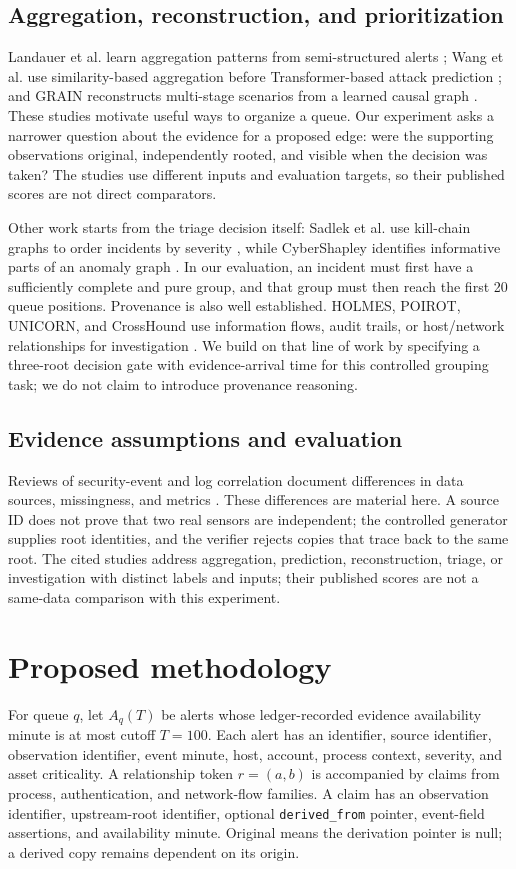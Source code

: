 \documentclass[pdflatex,sn-mathphys-num,iicol]{sn-jnl}
\begin{document}
\subsection{Aggregation, reconstruction, and prioritization}
Landauer et al. learn aggregation patterns from semi-structured alerts \cite{landauer2022}; Wang et al. use similarity-based aggregation before Transformer-based attack prediction \cite{wang2024}; and GRAIN reconstructs multi-stage scenarios from a learned causal graph \cite{grain2025}. These studies motivate useful ways to organize a queue. Our experiment asks a narrower question about the evidence for a proposed edge: were the supporting observations original, independently rooted, and visible when the decision was taken? The studies use different inputs and evaluation targets, so their published scores are not direct comparators.

Other work starts from the triage decision itself: Sadlek et al. use kill-chain graphs to order incidents by severity \cite{sadlek2025}, while CyberShapley identifies informative parts of an anomaly graph \cite{malach2025}. In our evaluation, an incident must first have a sufficiently complete and pure group, and that group must then reach the first 20 queue positions. Provenance is also well established. HOLMES, POIROT, UNICORN, and CrossHound use information flows, audit trails, or host/network relationships for investigation \cite{holmes2019,poirot2019,unicorn2020,crosshound2026}. We build on that line of work by specifying a three-root decision gate with evidence-arrival time for this controlled grouping task; we do not claim to introduce provenance reasoning.

\subsection{Evidence assumptions and evaluation}
Reviews of security-event and log correlation document differences in data sources, missingness, and metrics \cite{review2022,chuah2025}. These differences are material here. A source ID does not prove that two real sensors are independent; the controlled generator supplies root identities, and the verifier rejects copies that trace back to the same root. The cited studies address aggregation, prediction, reconstruction, triage, or investigation with distinct labels and inputs; their published scores are not a same-data comparison with this experiment.


\section{Proposed methodology}
For queue $q$, let $A_q(T)$ be alerts whose ledger-recorded evidence availability minute is at most cutoff $T=100$. Each alert has an identifier, source identifier, observation identifier, event minute, host, account, process context, severity, and asset criticality. A relationship token $r=(a,b)$ is accompanied by claims from process, authentication, and network-flow families. A claim has an observation identifier, upstream-root identifier, optional \texttt{derived\_from} pointer, event-field assertions, and availability minute. Original means the derivation pointer is null; a derived copy remains dependent on its origin.
\end{document}
